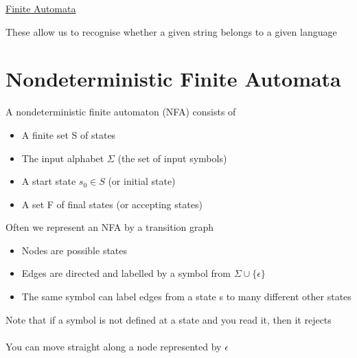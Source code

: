 \documentclass{article}[18pt]
\begin{document}
\begin{center}
\underline{\huge Finite Automata}
\end{center}
These allow us to recognise whether a given string belongs to a given language
\section{Nondeterministic Finite Automata}
A nondeterministic finite automaton (NFA) consists of
\begin{itemize}
	\item A finite set S of states
	\item The input alphabet $\Sigma$ (the set of input symbols)
	\item A start state $s_0\in S$ (or initial state)
	\item A set F of final states (or accepting states)
\end{itemize}
Often we represent an NFA by a transition graph
\begin{itemize}
	\item Nodes are possible states
	\item Edges are directed and labelled by a symbol from $\Sigma \cup \{\epsilon\}$
	\item The same symbol can label edges from a state s to many different other states 
\end{itemize}
Note that if a symbol is not defined at a state and you read it, then it rejects\\
\\
You can move straight along a node represented by $\epsilon$
\end{document}
